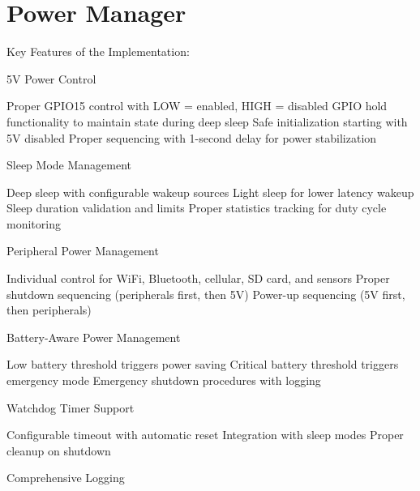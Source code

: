 \chapter{Power Manager }
\hypertarget{md__power_01_manager}{}\label{md__power_01_manager}
Key Features of the  Implementation\+:
\begin{DoxyEnumerate}
\item 5V Power Control
\end{DoxyEnumerate}

Proper GPIO15 control with LOW = enabled, HIGH = disabled GPIO hold functionality to maintain state during deep sleep Safe initialization starting with 5V disabled Proper sequencing with 1-\/second delay for power stabilization


\begin{DoxyEnumerate}
\item Sleep Mode Management
\end{DoxyEnumerate}

Deep sleep with configurable wakeup sources Light sleep for lower latency wakeup Sleep duration validation and limits Proper statistics tracking for duty cycle monitoring


\begin{DoxyEnumerate}
\item Peripheral Power Management
\end{DoxyEnumerate}

Individual control for Wi\+Fi, Bluetooth, cellular, SD card, and sensors Proper shutdown sequencing (peripherals first, then 5V) Power-\/up sequencing (5V first, then peripherals)


\begin{DoxyEnumerate}
\item Battery-\/\+Aware Power Management
\end{DoxyEnumerate}

Low battery threshold triggers power saving Critical battery threshold triggers emergency mode Emergency shutdown procedures with logging


\begin{DoxyEnumerate}
\item Watchdog Timer Support
\end{DoxyEnumerate}

Configurable timeout with automatic reset Integration with sleep modes Proper cleanup on shutdown


\begin{DoxyEnumerate}
\item Comprehensive Logging
\end{DoxyEnumerate}

